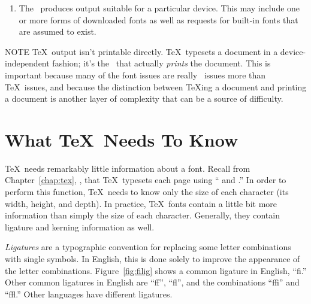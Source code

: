 \begin{enumerate}
        On file systems which have short filenames (for example, MS-DOS)
        a typical font directory is 
         (or
        ).\footnote{Older \dvidriver{}s
        may still use  files.  They are frequently stored 
        in directories
        with names like .}  The files are then
        simply .

        Some \dvidriver{}s employ automatic font generation to attempt
        to create the font if it cannot be found.
  \item The \dvidriver\ produces output suitable for a particular device.
        This may include one or more forms of downloaded fonts as well as
        requests for built-in fonts that are assumed to exist.
\end{enumerate}

\begin{note}{NOTE}
  \TeX\ output isn't printable directly.
  \TeX\ typesets a document in a device-independent fashion; it's the
  \dvidriver\ that actually {\em prints\/} the document.  This is important
  because many of the font issues are really \dvidriver\ issues more than
  \TeX\ issues, and because the distinction between \TeX{}ing a document
  and printing a document is another layer of complexity that can be a
  source of difficulty.
\end{note}

\section{What \protect\TeX\ Needs To Know}

\TeX\ needs remarkably little information about a font.  Recall from
Chapter~\ref{chap:tex}, \textit{}, that \TeX\ typesets
each page using `` and .''  In order to perform this
function, \TeX\ needs to know only the size of each character (its
width, height, and 
depth).
In practice, \TeX\ fonts contain a little
bit more information than simply the size of each character.
Generally, they contain ligature and kerning information as well.

{\em Ligatures\/} are a 
typographic convention for replacing some letter
combinations with single symbols.  In English, this is done solely to improve
the appearance of the letter combinations.  Figure~\ref{fig:filig}
shows a common ligature in English, ``fi.''  Other common ligatures
in English are ``ff'', ``fl'', and the combinations ``ffi'' and ``ffl.''
Other languages have different ligatures.

